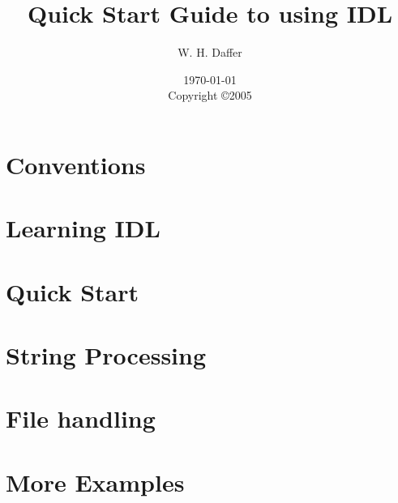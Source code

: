 \documentclass[11pt]{report}
\title{Quick Start Guide to using IDL}
\author{W. H. Daffer}
\date{\today \\
	Copyright \copyright 2005}
\begin{document}
\maketitle
\newpage

\tableofcontents

\newpage
\chapter{Conventions}

\chapter{Learning IDL}

\chapter{Quick Start}

\chapter{String Processing}

\chapter{File handling}

\chapter{More Examples}






\end{document}
